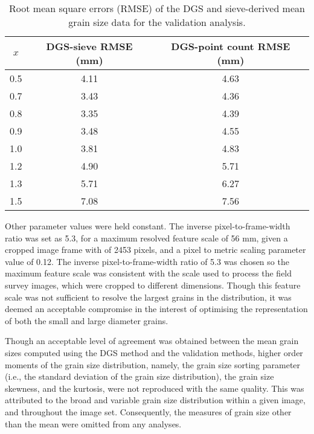 \begin{table}[tbp!]
	\caption[RMS errors: mean grain size data from wavelet method and sieve]{Root mean square errors (RMSE) of the DGS and sieve-derived mean grain size data for the validation analysis.} 
	\label{table:rmse}
	\centering
	\begin{tabular}{ccc}
		\hline
		$x$ & DGS-sieve RMSE (mm) & DGS-point count RMSE (mm)\\
		\hline
		0.5 & 4.11 & 4.63\\
		0.7 & 3.43 & 4.36\\
		0.8 & 3.35 & 4.39\\
		0.9 & 3.48 & 4.55\\
		1.0 & 3.81 & 4.83\\
		1.2 & 4.90 & 5.71\\
		1.3 & 5.71 & 6.27\\
		1.5 & 7.08 & 7.56\\
	\end{tabular}
\end{table}


Other parameter values were held constant. The inverse pixel-to-frame-width ratio was set as 5.3, for a maximum resolved feature scale of 56 mm, given a cropped image frame with of 2453 pixels, and a pixel to metric scaling parameter value of 0.12. The inverse pixel-to-frame-width ratio of 5.3 was chosen so the maximum feature scale was consistent with the scale used to process the field survey images, which were cropped to different dimensions. Though this feature scale was not sufficient to resolve the largest grains in the distribution, it was deemed an acceptable compromise in the interest of optimising the representation of both the small and large diameter grains.

Though an acceptable level of agreement was obtained between the mean grain sizes computed using the DGS method and the validation methods, higher order moments of the grain size distribution, namely, the grain size sorting parameter (i.e., the standard deviation of the grain size distribution), the grain size skewness, and the kurtosis, were not reproduced with the same quality. This was attributed to the broad and variable grain size distribution within a given image, and throughout the image set. Consequently, the measures of grain size other than the mean were omitted from any analyses.



